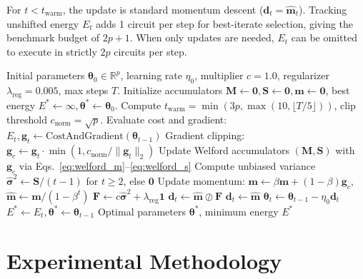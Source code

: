 \documentclass[11pt,a4paper]{article}
\begin{document}
For $t < t_{\text{warm}}$, the update is standard momentum descent ($\mathbf{d}_t = \hat{\mathbf{m}}_t$). Tracking unshifted energy $E_t$ adds 1 circuit per step for best-iterate selection, giving the benchmark budget of $2p+1$. When only updates are needed, $E_t$ can be omitted to execute in strictly $2p$ circuits per step.

\begin{algorithm}[H]
\caption{SIGMA-QGD Optimization Algorithm}
\label{alg:sigma_qgd}
\begin{algorithmic}[1]
\REQUIRE Initial parameters $\boldsymbol{\theta}_0 \in \mathbb{R}^p$, learning rate $\eta_0$, multiplier $c=1.0$, regularizer $\lambda_{\text{reg}}=0.005$, max steps $T$.
\STATE Initialize accumulators $\mathbf{M} \leftarrow \mathbf{0}, \mathbf{S} \leftarrow \mathbf{0}, \mathbf{m} \leftarrow \mathbf{0}$, best energy $E^* \leftarrow \infty, \boldsymbol{\theta}^* \leftarrow \boldsymbol{\theta}_0$.
\STATE Compute $t_{\text{warm}} = \min(3p, \max(10, \lfloor T/5 \rfloor))$, clip threshold $c_{\text{norm}} = \sqrt{p}$.
    \STATE Evaluate cost and gradient: $E_t, \mathbf{g}_t \leftarrow \text{CostAndGradient}(\boldsymbol{\theta}_{t-1})$ \hfill {}
    \STATE Gradient clipping: $\mathbf{g}_c \leftarrow \mathbf{g}_t \cdot \min(1, c_{\text{norm}} / \|\mathbf{g}_t\|_2)$
    \STATE Update Welford accumulators $(\mathbf{M}, \mathbf{S})$ with $\mathbf{g}_c$ via Eqs.~\eqref{eq:welford_m}--\eqref{eq:welford_s}
    \STATE Compute unbiased variance $\hat{\boldsymbol{\sigma}}^2 \leftarrow \mathbf{S} / (t-1)$ for $t \ge 2$, else $\mathbf{0}$
    \STATE Update momentum: $\mathbf{m} \leftarrow \beta \mathbf{m} + (1-\beta)\mathbf{g}_c$, $\hat{\mathbf{m}} \leftarrow \mathbf{m} / (1-\beta^t)$
        \STATE $\mathbf{F} \leftarrow c \hat{\boldsymbol{\sigma}}^2 + \lambda_{\text{reg}} \mathbf{1}$
        \STATE $\mathbf{d}_t \leftarrow \hat{\mathbf{m}} \oslash \mathbf{F}$
    \ELSE
        \STATE $\mathbf{d}_t \leftarrow \hat{\mathbf{m}}$
    \ENDIF
    \STATE $\boldsymbol{\theta}_t \leftarrow \boldsymbol{\theta}_{t-1} - \eta_0 \mathbf{d}_t$
        \STATE $E^* \leftarrow E_t, \boldsymbol{\theta}^* \leftarrow \boldsymbol{\theta}_{t-1}$
    \ENDIF
\ENDFOR
\RETURN Optimal parameters $\boldsymbol{\theta}^*$, minimum energy $E^*$
\end{algorithmic}
\end{algorithm}

\FloatBarrier

\section{Experimental Methodology}
\label{sec:setup}
\end{document}
